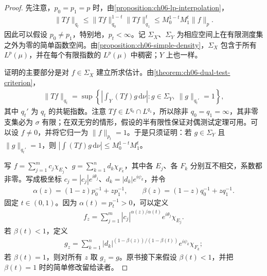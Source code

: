 \documentclass[../../main.tex]{subfiles}
\begin{document}
\begin{proof}
先注意，$p_0=p_1=p$ 时，由\cref{proposition:ch06-lp-interpolation}，
\begin{align*}
\|Tf\|_{q_t}\leqslant\|Tf\|_{q_0}^{1-t}\|Tf\|_{q_1}^t
\leqslant M_0^{1-t}M_1^t\|f\|_p.
\end{align*}
因此可以假设 $p_0\ne p_1$，特别地，$p_t<\infty$。记 $\Sigma_X$、$\Sigma_Y$ 为相应空间上在有限测度集之外为零的简单函数空间。由\cref{proposition:ch06-simple-density}，$\Sigma_X$ 包含于所有 $L^p(\mu)$，并在每个有限指数的 $L^p(\mu)$ 中稠密；$Y$ 上也一样。

证明的主要部分是对 $f\in\Sigma_X$ 建立所求估计。由\cref{theorem:ch06-dual-test-criterion}，
\begin{align*}
\|Tf\|_{q_t}=\sup\left\{\left|\int_Y(Tf)g\,\mathrm d\nu\right|:
g\in\Sigma_Y,\ \|g\|_{q_t'}=1\right\},
\end{align*}
其中 $q_t'$ 为 $q_t$ 的共轭指数。注意 $Tf\in L^{q_0}\cap L^{q_1}$，所以除非 $q_0=q_1=\infty$，其非零支集必为 $\sigma$ 有限；在双无穷的情形，假设的半有限性保证对偶测试定理可用。可以设 $f\ne0$，并将它归一为 $\|f\|_{p_t}=1$。于是只须证明：若 $g\in\Sigma_Y$ 且 $\|g\|_{q_t'}=1$，则 $|\int(Tf)g\,\mathrm d\nu|\leqslant M_0^{1-t}M_1^t$。

写 $f=\sum_{j=1}^m c_j\chi_{E_j}$、$g=\sum_{k=1}^n d_k\chi_{F_k}$，其中各 $E_j$、各 $F_k$ 分别互不相交，系数都非零。写成极坐标 $c_j=|c_j|e^{i\theta_j}$、$d_k=|d_k|e^{i\psi_k}$，并令
\begin{align*}
\alpha(z)=(1-z)p_0^{-1}+zp_1^{-1},\qquad
\beta(z)=(1-z)q_0^{-1}+zq_1^{-1}.
\end{align*}
固定 $t\in(0,1)$。因为 $\alpha(t)=p_t^{-1}>0$，可以定义
\begin{align*}
f_z=\sum_{j=1}^m|c_j|^{\alpha(z)/\alpha(t)}e^{i\theta_j}\chi_{E_j}.
\end{align*}
若 $\beta(t)<1$，定义
\begin{align*}
g_z=\sum_{k=1}^n|d_k|^{(1-\beta(z))/(1-\beta(t))}e^{i\psi_k}\chi_{F_k};
\end{align*}
若 $\beta(t)=1$，则对所有 $z$ 取 $g_z=g$。原书接下来假设 $\beta(t)<1$，并把 $\beta(t)=1$ 时的简单修改留给读者。


\end{proof}
\end{document}
